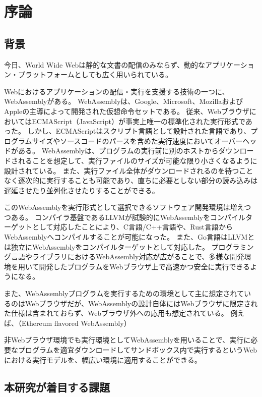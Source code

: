 \chapter{序論}
\label{chap:introduction}

\section{背景}
\label{section:background}

今日、World Wide Webは静的な文書の配信のみならず、動的なアプリケーション・プラットフォームとしても広く用いられている。

Webにおけるアプリケーションの配信・実行を支援する技術の一つに、WebAssemblyがある。
WebAssemblyは、Google、Microsoft、MozillaおよびAppleの主導によって開発された仮想命令セットである\cite{webassembly}。
従来、WebブラウザにおいてはECMAScript（JavaScript）が事実上唯一の標準化された実行形式であった。
しかし、ECMAScriptはスクリプト言語として設計された言語であり\cite{ecma2018}、プログラムサイズやソースコードのパースを含めた実行速度においてオーバーヘッドがある。
WebAssemblyは、プログラムの実行前に別のホストからダウンロードされることを想定して、実行ファイルのサイズが可能な限り小さくなるように設計されている。
また、実行ファイル全体がダウンロードされるのを待つことなく逐次的に実行することも可能であり、直ちに必要としない部分の読み込みは遅延させたり並列化させたりすることができる。

このWebAssemblyを実行形式として選択できるソフトウェア開発環境は増えつつある。
コンパイラ基盤であるLLVMが試験的にWebAssemblyをコンパイルターゲットとして対応した\cite{}ことにより、C言語/C++言語や、Rust言語\cite{rust_wasm}からWebAssemblyへコンパイルすることが可能になった。
また、Go言語はLLVMとは独立にWebAssemblyをコンパイルターゲットとして対応した\cite{go_wasm}。
プログラミング言語やライブラリにおけるWebAssembly対応が広がることで、多様な開発環境を用いて開発したプログラムをWebブラウザ上で高速かつ安全に実行できるようになる。

また、WebAssemblyプログラムを実行するための環境として主に想定されているのはWebブラウザだが、WebAssemblyの設計自体にはWebブラウザに限定された仕様は含まれておらず、Webブラウザ外への応用も想定されている。
例えば、（Ethereum flavored WebAssembly）

非Webブラウザ環境でも実行環境としてWebAssemblyを用いることで、実行に必要なプログラムを適宜ダウンロードしてサンドボックス内で実行するというWebにおける実行モデルを、幅広い環境に適用することができる。

\section{本研究が着目する課題}

